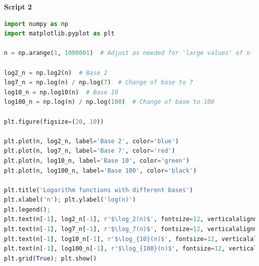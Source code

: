 \documentclass[addpoints]{exam}
\begin{document}
\textbf{Script 2}
\begin{lstlisting}[language=Python, caption=Python script for plotting logarithmic functions]
import numpy as np
import matplotlib.pyplot as plt

n = np.arange(1, 1000001)  # Adjust as needed for 'large values' of n

log2_n = np.log2(n)  # Base 2
log7_n = np.log(n) / np.log(7)  # Change of base to 7
log10_n = np.log10(n)  # Base 10
log100_n = np.log(n) / np.log(100)  # Change of base to 100

plt.figure(figsize=(20, 10))

plt.plot(n, log2_n, label='Base 2', color='blue')
plt.plot(n, log7_n, label='Base 7', color='red')
plt.plot(n, log10_n, label='Base 10', color='green')
plt.plot(n, log100_n, label='Base 100', color='black')

plt.title('Logarithm functions with different bases')
plt.xlabel('n'); plt.ylabel('log(n)')
plt.legend(); 
plt.text(n[-1], log2_n[-1], r'$\log_2(n)$', fontsize=12, verticalalignment='bottom', horizontalalignment='right')
plt.text(n[-1], log7_n[-1], r'$\log_7(n)$', fontsize=12, verticalalignment='bottom', horizontalalignment='right')
plt.text(n[-1], log10_n[-1], r'$\log_{10}(n)$', fontsize=12, verticalalignment='bottom', horizontalalignment='right')
plt.text(n[-1], log100_n[-1], r'$\log_{100}(n)$', fontsize=12, verticalalignment='bottom', horizontalalignment='right')
plt.grid(True); plt.show()

\end{lstlisting}
\end{document}
